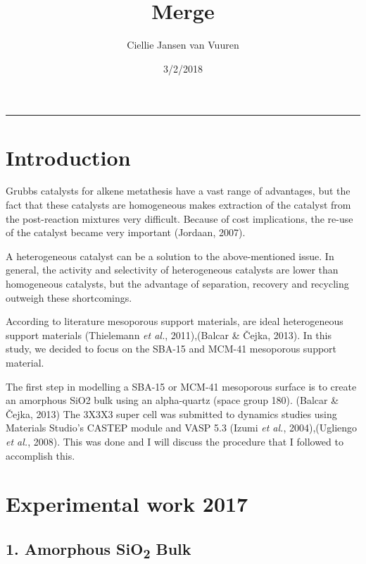 \documentclass[]{article}
\title{Merge}
\author{Ciellie Jansen van Vuuren}
\date{3/2/2018}
\begin{document}
\maketitle

\begin{center}\rule{0.5\linewidth}{\linethickness}\end{center}

\hypertarget{introduction}{%
\section{Introduction}\label{introduction}}

Grubbs catalysts for alkene metathesis have a vast range of advantages,
but the fact that these catalysts are homogeneous makes extraction of
the catalyst from the post-reaction mixtures very difficult. Because of
cost implications, the re-use of the catalyst became very important
(Jordaan, 2007).

A heterogeneous catalyst can be a solution to the above-mentioned issue.
In general, the activity and selectivity of heterogeneous catalysts are
lower than homogeneous catalysts, but the advantage of separation,
recovery and recycling outweigh these shortcomings.

According to literature mesoporous support materials, are ideal
heterogeneous support materials (Thielemann \emph{et al.}, 2011),(Balcar
\& Čejka, 2013). In this study, we decided to focus on the SBA-15 and
MCM-41 mesoporous support material.

The first step in modelling a SBA-15 or MCM-41 mesoporous surface is to
create an amorphous SiO2 bulk using an alpha-quartz (space group 180).
(Balcar \& Čejka, 2013) The 3X3X3 super cell was submitted to dynamics
studies using Materials Studio's CASTEP module and VASP 5.3 (Izumi
\emph{et al.}, 2004),(Ugliengo \emph{et al.}, 2008). This was done and I
will discuss the procedure that I followed to accomplish this.

\hypertarget{experimental-work-2017}{%
\section{Experimental work 2017}\label{experimental-work-2017}}

\hypertarget{amorphous-sio2-bulk}{%
\subsection{\texorpdfstring{1. Amorphous SiO\textsubscript{2}
Bulk}{1. Amorphous SiO2 Bulk}}\label{amorphous-sio2-bulk}}
\end{document}
